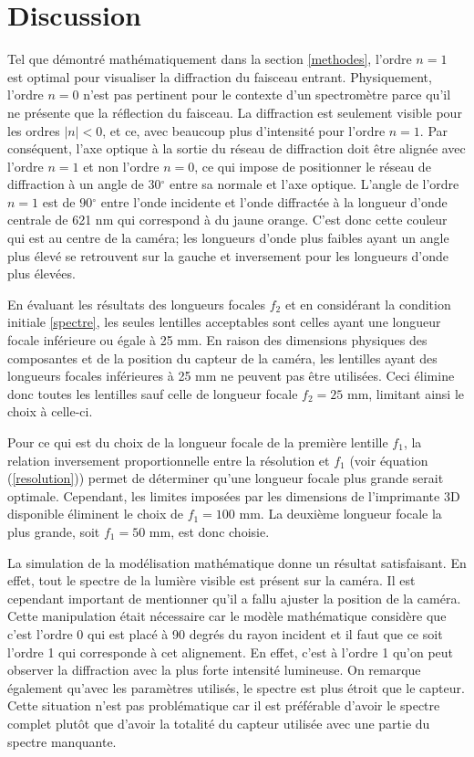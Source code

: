 \documentclass[conference]{IEEEtran}
\begin{document}
\section{Discussion}
Tel que démontré mathématiquement dans la section \ref{methodes}, l'ordre $n=1$ est optimal pour visualiser la diffraction
du faisceau entrant. Physiquement, l'ordre $n=0$ n'est pas pertinent pour le contexte d'un spectromètre parce qu'il ne présente que 
la réflection du faisceau. La diffraction est seulement visible pour les ordres $|n|<0$, et ce, avec beaucoup plus d'intensité pour l'ordre $n=1$.
Par conséquent, l'axe optique à la sortie du réseau de diffraction doit être alignée avec l'ordre $n=1$ et non l'ordre $n=0$, ce qui impose
de positionner le réseau de diffraction à un angle de $30{^\circ}$ entre sa normale et l'axe optique. L'angle de l'ordre $n=1$ est de $90{^\circ}$ entre 
l'onde incidente et l'onde diffractée à la longueur d'onde centrale de 621 nm qui correspond à du jaune orange.
C'est donc cette couleur qui est au centre de la caméra; les longueurs d'onde plus faibles ayant un angle  
plus élevé se retrouvent sur la gauche et inversement pour les longueurs d'onde plus élevées.

En évaluant les résultats des longueurs focales $f_2$ et en considérant la condition initiale \ref{spectre}, les seules lentilles acceptables sont celles
ayant une longueur focale inférieure ou égale à 25 mm. En raison des dimensions physiques des composantes et de
la position du capteur de la caméra, les lentilles ayant des longueurs focales inférieures à 25 mm ne peuvent pas être utilisées.
Ceci élimine donc toutes les lentilles sauf celle de longueur focale $f_2=25$ mm, limitant ainsi le choix à celle-ci.

Pour ce qui est du choix de la longueur focale de la première lentille $f_1$, la relation inversement proportionnelle
entre la résolution et $f_1$ (voir équation (\ref{resolution})) permet de déterminer qu'une longueur focale plus grande serait optimale. Cependant,
les limites imposées par les dimensions de l'imprimante 3D disponible éliminent le choix de $f_1=100$ mm. La deuxième longueur focale la plus grande, soit $f_1=50$ mm,
est donc choisie.

La simulation de la modélisation mathématique donne un résultat satisfaisant. En effet, tout le spectre
de la lumière visible est présent sur la caméra. Il est cependant important de mentionner qu'il a fallu ajuster la
position de la caméra. Cette manipulation était nécessaire car le modèle mathématique considère que c'est l'ordre 0 qui est placé à 90 degrés du rayon
incident et il faut que ce soit l'ordre 1 qui corresponde à cet alignement. En effet, c'est à l'ordre 1 qu'on peut observer
la diffraction avec la plus forte intensité lumineuse. On remarque également qu'avec les paramètres utilisés, le spectre est plus étroit
que le capteur. Cette situation n'est pas problématique car il est préférable d'avoir le spectre complet plutôt que d'avoir la totalité du capteur utilisée
avec une partie du spectre manquante.
\end{document}
